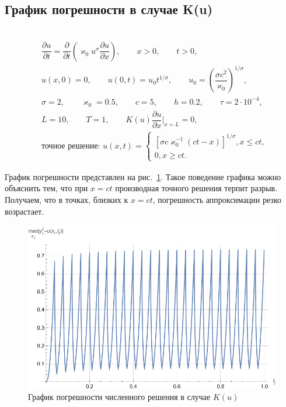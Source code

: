 \documentclass[12pt, a4paper]{article}
\begin{document}
	\subsection{График погрешности в случае K(u)}
	
	\hphantom{1}\\[-2.5cm]
	
	\begin{eqnarray*}
		& \dfrac{\partial u}{\partial t} = \dfrac{\partial}{\partial t}\left(\varkappa_0 u^\sigma \dfrac{\partial u}{\partial x}\right), \qquad x > 0, \qquad t > 0,\\
		& u(x, 0) = 0, \qquad u(0, t) = u_0 t^{1/\sigma}, \qquad u_0 = \left(\dfrac{\sigma c^2}{\varkappa_0}\right)^{1/\sigma},\\
		& \sigma = 2, \qquad \varkappa_0 = 0.5, \qquad c = 5, \qquad h = 0.2, \qquad \tau=2 \cdot 10^{-4},\\
		& L = 10, \qquad T = 1, \qquad K(u) \dfrac{\partial u}{\partial x}\Bigg|_{x = L} = 0,\\
		& \textrm{точное решение: } u(x, t) = \begin{cases}
			[\sigma c \varkappa_0^{-1}(ct-x)]^{1/\sigma}, x \le ct,\\
			0, x \ge ct.
		\end{cases}
	\end{eqnarray*}
	
	График погрешности представлен на рис.~\ref{error_u}.
	Такое поведение графика можно объяснить тем, что при $x = ct$ производная точного решения терпит разрыв. Получаем, что в точках, близких к $x = ct$, погрешность аппроксимации резко возрастает.
	
	\begin{figure}[h!]
		\centering
		\includegraphics[width=0.85\linewidth]{error_u}
		\caption{График погрешности численного решения в случае $K(u)$}
		\label{error_u}
	\end{figure}
	
\end{document}
